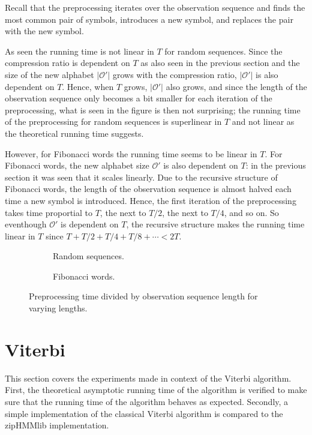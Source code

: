 Recall that the preprocessing iterates over the observation sequence and finds
the most common pair of symbols, introduces a new symbol, and replaces the pair
with the new symbol.

As seen the running time is not linear in $T$ for random sequences. Since the
compression ratio is dependent on $T$ as also seen in the previous section and
the size of the new alphabet $\lvert\mathcal{O'}\rvert$ grows with the
compression ratio, $\lvert\mathcal{O'}\rvert$ is also dependent on $T$. Hence,
when $T$ grows, $\lvert\mathcal{O'}\rvert$ also grows, and since the length of
the observation sequence only becomes a bit smaller for each iteration of the
preprocessing, what is seen in the figure is then not surprising; the running
time of the preprocessing for random sequences is superlinear in $T$ and not
linear as the theoretical running time suggests.

However, for Fibonacci words the running time seems to be linear in $T$. For
Fibonacci words, the new alphabet size $\mathcal{O'}$ is also dependent on $T$:
in the previous section it was seen that it scales linearly. Due to the
recursive structure of Fibonacci words, the length of the observation sequence
is almost halved each time a new symbol is introduced. Hence, the first
iteration of the preprocessing takes time proportial to $T$, the next to $T/2$,
the next to $T/4$, and so on. So eventhough $\mathcal{O'}$ is dependent on $T$,
the recursive structure makes the running time linear in $T$ since
$T + T/2 + T/4 + T/8 + \cdots < 2T$.

\begin{figure}
  \centering
  \begin{subfigure}[b]{0.5\textwidth}
    \centering 
    \caption{Random sequences.}
  \end{subfigure}%
  \begin{subfigure}[b]{0.5\textwidth}
    \centering 
    \caption{Fibonacci words.}
  \end{subfigure}
  \caption{Preprocessing time divided by observation sequence length for
    varying lengths.}
  \label{fig:pre_viterbi_T}
\end{figure}

\section{Viterbi}

This section covers the experiments made in context of the Viterbi algorithm.
First, the theoretical asymptotic running time of the algorithm is verified to
make sure that the running time of the algorithm behaves as expected. Secondly,
a simple implementation of the classical Viterbi algorithm is compared to the
zipHMMlib implementation.

